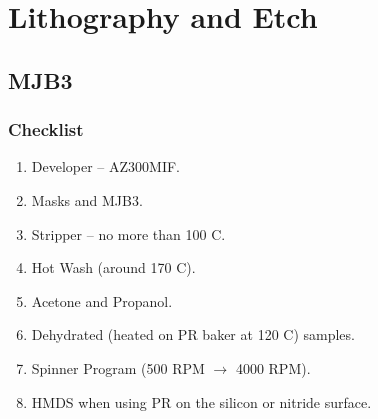 
\section{Lithography and Etch}
\subsection{MJB3}
\subsubsection{Checklist}
\begin{enumerate}
\item Developer -- AZ300MIF.
\item Masks and MJB3.
\item Stripper -- no more than 100 C.
\item Hot Wash (around 170 C).
\item Acetone and Propanol.
\item Dehydrated (heated on PR baker at 120 C) samples.
\item Spinner Program (500 RPM $\rightarrow$ 4000 RPM).
\item HMDS when using PR on the silicon or nitride surface.
\end{enumerate}
